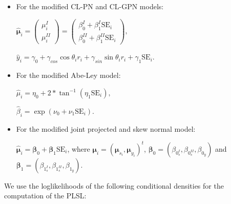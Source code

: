 \documentclass[11pt,]{article}
\begin{document}
\begin{itemize}
\item For the modified CL-PN and CL-GPN models:

$\hat{\boldsymbol{\mu}}_{i} = \begin{pmatrix}
  \mu_{i}^{I}  \\
\mu_{i}^{II}
 \end{pmatrix}=\begin{pmatrix}
  \beta_0^{I} + \beta_1^{I}\text{SE}_i  \\
  \beta_0^{II} + \beta_1^{II}\text{SE}_i
 \end{pmatrix},$

$\hat{y}_i = \gamma_0 + \gamma_{cos}\cos\theta_ir_i + \gamma_{sin}\sin\theta_ir_i + \gamma_1\text{SE}_i.$

\item For the modified Abe-Ley model:

$\hat{\mu}_{i} = \eta_0 + 2 * \tan^{-1}(\eta_1\text{SE}_i),$

$\hat{\beta}_{i} = \exp(\nu_0 + \nu_1\text{SE}_i).$

\item For the modified joint projected and skew normal model:

$\hat{\boldsymbol{\mu}}_{i} = \boldsymbol{\beta}_0 + \boldsymbol{\beta}_1\text{SE}_i$, where $\boldsymbol{\mu}_i = (\boldsymbol{\mu}_{s_i}, \boldsymbol{\mu}_{y_i})^t$, $\boldsymbol{\beta}_0 = (\beta_{0_s^{I}}, \beta_{0_s^{II}},\beta_{0_y})$ and $\boldsymbol{\beta}_1 = (\beta_{1_s^{I}}, \beta_{1_s^{II}},\beta_{1_y})$.
\end{itemize}

We use the loglikelihoods of the following conditional densities for the
computation of the PLSL:
\end{document}

